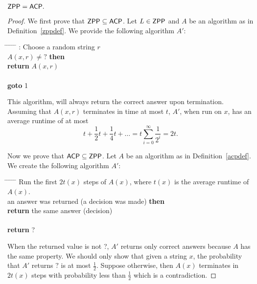 \begin{proposition}
$\mathsf{ZPP} = \mathsf{ACP}.$
\end{proposition}
\begin{proof}
We first prove that $\mathsf{ZPP} \subseteq \mathsf{ACP}$. Let $L \in \mathsf{ZPP}$ and $A$ be an algorithm as in Definition~\ref{zppdef}. We provide the following algorithm $A'$:
\begin{tabbing}
\hspace*{.25in} \= \hspace*{.25in} \= \hspace*{.25in} \= \hspace*{.25in} \= \hspace*{.25in} \=\kill
{}: Choose a random string $r$\\
 $A(x, r) \not = ?$ {\bf then } \\
\>\> {\bf return} $A(x, r)$ \\
 \\
\>\> {\bf goto} 1\\
\end{tabbing}

This algorithm, will always return the correct answer upon termination. Assuming that $A(x, r)$ terminates in time at most $t$, $A'$, when run on $x$, has an average runtime of at most $$t + \frac{1}{2} t + \frac{1}{4} t + \ldots = t \sum_{i=0}^\infty \frac{1}{2^i} = 2t.$$

Now we prove that $\mathsf{ACP} \subseteq \mathsf{ZPP}$. Let $A$ be an algorithm as in Definition~\ref{acpdef}. We create the following algorithm $A'$:

\begin{tabbing}
\hspace*{.25in} \= \hspace*{.25in} \= \hspace*{.25in} \= \hspace*{.25in} \= \hspace*{.25in} \=\kill
\> Run the first $2 t(x)$ steps of $A(x)$, where $t(x)$ is the average runtime of $A(x)$. \\
 an answer was returned (a decision was made) {\bf then } \\
\>\> {\bf return} the same answer (decision) \\
 \\
\>\> {\bf return} ?\\
\end{tabbing}

When the returned value is not ?, $A'$ returns only correct answers because $A$ has the same property. We should only show that given a string $x$, the probability that $A'$ returns $?$ is at most $\frac{1}{2}$. Suppose otherwise, then $A(x)$ terminates in $2 t(x)$ steps with probability less than $\frac{1}{2}$ which is a contradiction.
\end{proof}


